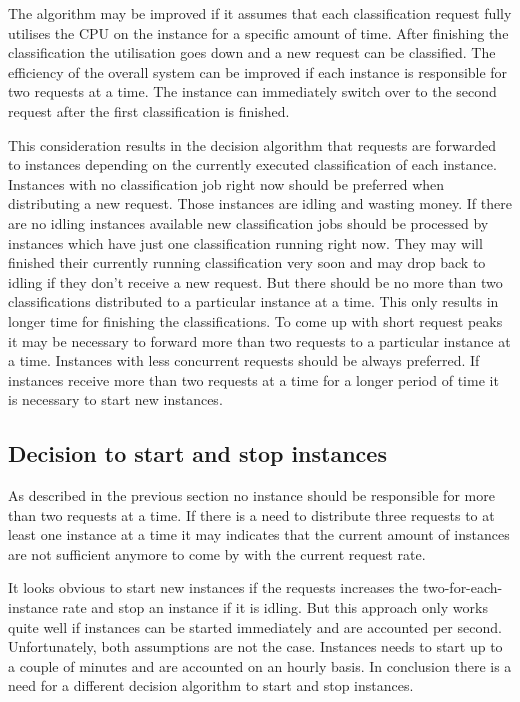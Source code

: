 The algorithm may be improved if it assumes that each classification request fully utilises the CPU on the instance for a specific amount of time. After finishing the classification the utilisation goes down and a new request can be classified. The efficiency of the overall system can be improved if each instance is responsible for two requests at a time. The instance can immediately switch over to the second request after the first classification is finished. 

This consideration results in the decision algorithm that requests are forwarded to instances depending on the currently executed classification of each instance. Instances with no classification job right now should be preferred when distributing a new request. Those instances are idling and wasting money. If there are no idling instances available new classification jobs should be processed by instances which have just one classification running right now. They may will finished their currently running classification very soon and may drop back to idling if they don't receive a new request. But there should be no more than two classifications distributed to a particular instance at a time. This only results in longer time for finishing the classifications. To come up with short request peaks it may be necessary to forward more than two requests to a particular instance at a time. Instances with less concurrent requests should be always preferred. If instances receive more than two requests at a time for a longer period of time it is necessary to start new instances.


\subsection{Decision to start and stop instances}
As described in the previous section no instance should be responsible for more than two requests at a time. If there is a need to distribute three requests to at least one instance at a time it may indicates that the current amount of instances are not sufficient anymore to come by with the current request rate.

It looks obvious to start new instances if the requests increases the two-for-each-instance rate and stop an instance if it is idling. But this approach only works quite well if instances can be started immediately and are accounted per second. Unfortunately, both assumptions are not the case. Instances needs to start up to a couple of minutes and are accounted on an hourly basis. In conclusion there is a need for a different decision algorithm to start and stop instances. 


